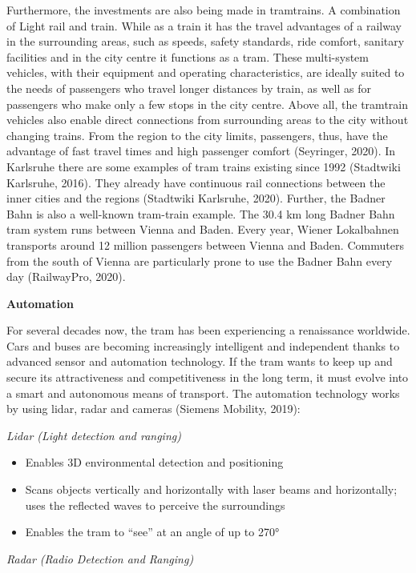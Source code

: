 \documentclass[
]{book}
\providecommand{\tightlist}{%
  \setlength{\itemsep}{0pt}\setlength{\parskip}{0pt}}
\begin{document}
Furthermore, the investments are also being made in tramtrains. A combination of Light rail and train. While as a train it has the travel advantages of a railway in the surrounding areas, such as speeds, safety standards, ride comfort, sanitary facilities and in the city centre it functions as a tram. These multi-system vehicles, with their equipment and operating characteristics, are ideally suited to the needs of passengers who travel longer distances by train, as well as for passengers who make only a few stops in the city centre. Above all, the tramtrain vehicles also enable direct connections from surrounding areas to the city without changing trains. From the region to the city limits, passengers, thus, have the advantage of fast travel times and high passenger comfort (Seyringer, 2020). In Karlsruhe there are some examples of tram trains existing since 1992 (Stadtwiki Karlsruhe, 2016). They already have continuous rail connections between the inner cities and the regions (Stadtwiki Karlsruhe, 2020). Further, the Badner Bahn is also a well-known tram-train example. The 30.4 km long Badner Bahn tram system runs between Vienna and Baden. Every year, Wiener Lokalbahnen transports around 12 million passengers between Vienna and Baden. Commuters from the south of Vienna are particularly prone to use the Badner Bahn every day (RailwayPro, 2020).

\textbf{Automation}

For several decades now, the tram has been experiencing a renaissance worldwide. Cars and buses are becoming increasingly intelligent and independent thanks to advanced sensor and automation technology. If the tram wants to keep up and secure its attractiveness and competitiveness in the long term, it must evolve into a smart and autonomous means of transport. The automation technology works by using lidar, radar and cameras (Siemens Mobility, 2019):

\emph{Lidar (Light detection and ranging)}

\begin{itemize}
\tightlist
\item
  Enables 3D environmental detection and positioning
\item
  Scans objects vertically and horizontally with laser beams and horizontally; uses the reflected waves to perceive the surroundings
\item
  Enables the tram to ``see'' at an angle of up to 270°
\end{itemize}

\emph{Radar (Radio Detection and Ranging)}
\end{document}
